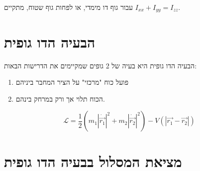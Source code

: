 \documentclass{tstextbook}
\begin{document}
\begin{theorem}
עבור גוף דו מימדי, או לפחות גוף שטוח, מתקיים \(I_{x x}+I_{yy}=I_{zz}\).

\end{theorem}
\section{הבעיה הדו גופית}

הבעיה הדו גופית היא בעיה של 2 גופים שמקיימים את הדרישות הבאות:

\begin{enumerate}
  \item פועל כוח "מרכזי" על הציר המחבר ביניהם 


  \item הכוח תלוי אך ורק במרחק בינהם. 


\end{enumerate}
\begin{proposition}
$$ \mathcal{L}=\frac12\left(m_1\left|\dot{\vec{r_1}}\right|^2+m_2\left|\dot{\vec{r_2}}\right|^2\right)-V\left(|\vec{r_1}-\vec{r_2}|\right)$$

\end{proposition}
\section{מציאת המסלול בבעיה הדו גופית}
\end{document}
